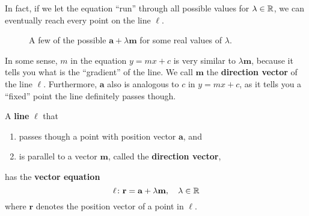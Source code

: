 \documentclass[12pt]{article}
\renewcommand{\vec}{\mathbf}
\begin{document}
\begin{disc}
	In fact, if we let the equation ``run'' through all possible values for \(\lambda \in \mathbb{R}\), we can eventually reach every point on the line \(\ell\).
	\begin{figure}[H]
		\centering
		\caption{A few of the possible \(\vec{a} + \lambda \vec{m}\) for some real values of \(\lambda\).}
	\end{figure}

	In some sense, \(m\) in the equation \(y = mx + c\) is very similar to \(\lambda \vec{m}\), because it tells you what is the ``gradient'' of the line.
	We call \(\vec{m}\) the \textbf{direction vector} of the line \(\ell\).
	Furthermore, \(\vec{a}\) also is analogous to \(c\) in \(y = mx + c\), as it tells you a ``fixed'' point the line definitely passes though.
\end{disc}

\begin{defn}
	A \textbf{line} \(\ell\) that 
	\begin{enumerate}
		\item passes though a point with position vector \(\vec{a}\), and
		\item is parallel to a vector \(\vec{m}\), called the \textbf{direction vector},
	\end{enumerate}
	has the \textbf{vector equation}
	\[ \ell \colon \vec{r} = \vec{a} + \lambda \vec{m}, \quad \lambda \in \R \] 
	where \(\vec{r}\) denotes the position vector of a point in \(\ell\). 
\end{defn}
\end{document}
